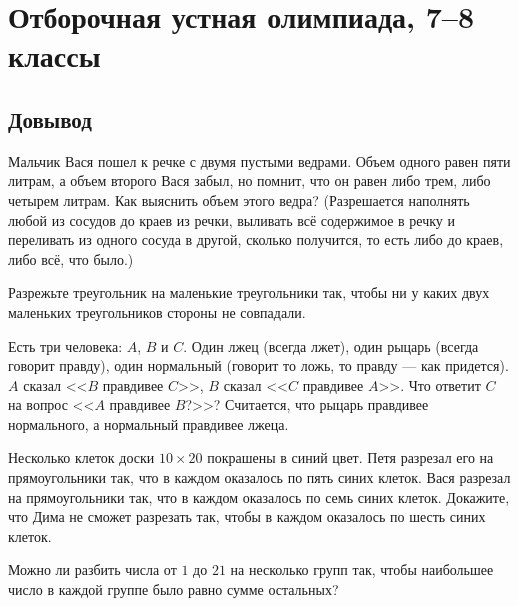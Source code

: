

\section*{Отборочная устная олимпиада, 7--8 классы}





\subsection*{Довывод}

\begin{problems}

\item
Мальчик Вася пошел к речке с двумя пустыми ведрами.
Объем одного равен пяти литрам, а объем второго Вася забыл, но помнит, что он
равен либо трем, либо четырем литрам.
Как выяснить объем этого ведра?
(Разрешается наполнять любой из сосудов до краев из речки, выливать всё
содержимое в речку и переливать из одного сосуда в другой, сколько получится,
то есть либо до краев, либо всё, что было.)

\item
Разрежьте треугольник на маленькие треугольники так, чтобы ни у каких двух
маленьких треугольников стороны не совпадали.

\item
Есть три человека: $A$, $B$ и $C$.
Один лжец (всегда лжет), один рыцарь (всегда говорит правду), один нормальный
(говорит то ложь, то правду --- как придется).
$A$ сказал <<$B$ правдивее $C$>>, $B$ сказал <<$C$ правдивее $A$>>.
Что ответит $C$ на вопрос <<$A$ правдивее $B$?>>?
Считается, что рыцарь правдивее нормального, а нормальный правдивее лжеца.

\item
Несколько клеток доски $10 \times 20$ покрашены в синий цвет.
Петя разрезал его на прямоугольники так, что в каждом оказалось по пять синих
клеток.
Вася разрезал на прямоугольники так, что в каждом оказалось по семь синих
клеток.
Докажите, что Дима не сможет разрезать так, чтобы в каждом оказалось по шесть
синих клеток.

\item
Можно ли разбить числа от $1$ до $21$ на несколько групп так, чтобы наибольшее
число в каждой группе было равно сумме остальных?

\end{problems}



